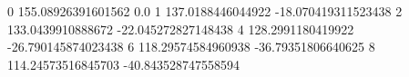 0 155.08926391601562 0.0
1 137.0188446044922 -18.070419311523438
2 133.0439910888672 -22.045272827148438
4 128.2991180419922 -26.790145874023438
6 118.29574584960938 -36.79351806640625
8 114.24573516845703 -40.843528747558594
